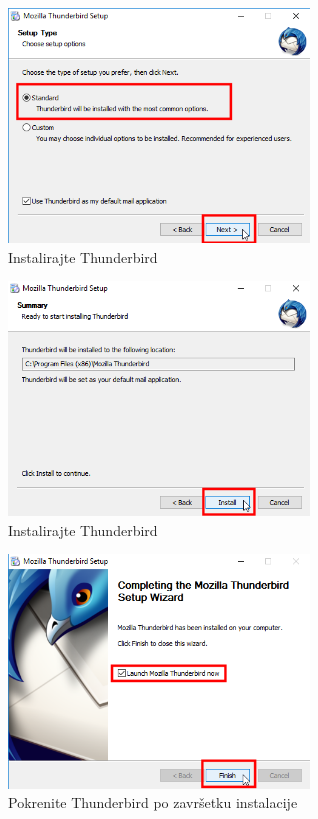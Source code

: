\documentclass[a4paper,11pt]{article}
\begin{document}
\newpage
\begin{figure}[!h]
	\begin{center}
		\includegraphics[width=8cm]{24_Mozilla_Thunderbird_Setup.png}
		\caption{Instalirajte Thunderbird}
		\label{initialscreen}
	\end{center}
\end{figure}
\begin{figure}[!h]
	\begin{center}
		\includegraphics[width=8cm]{25_Mozilla_Thunderbird_Setup.png}
		\caption{Instalirajte Thunderbird}
		\label{initialscreen}
	\end{center}
\end{figure}
\newpage
\begin{figure}[!h]
	\begin{center}
		\includegraphics[width=8cm]{26_Mozilla_Thunderbird_Setup.png}
		\caption{Pokrenite Thunderbird po zavr\v{s}etku instalacije}
		\label{initialscreen}
	\end{center}
\end{figure}
\end{document}
